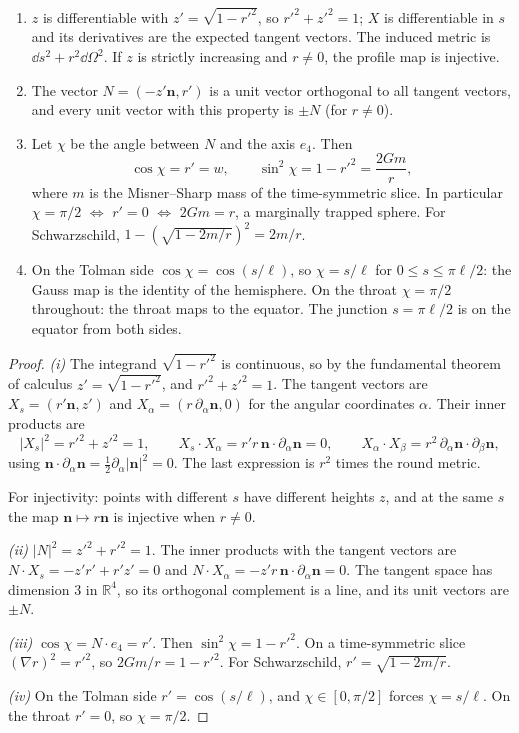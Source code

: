 \begin{theorem}\label{thm:gaussmap}\ver\
\begin{enumerate}[label=(\roman*)]
\item $z$ is differentiable with $z'=\sqrt{1-r'^2}$, so $r'^2+z'^2=1$; $X$ is differentiable in $s$ and its derivatives are the expected tangent vectors. The induced metric is $\dd s^2+r^2\dd\Omega^2$. If $z$ is strictly increasing and $r\ne0$, the profile map is injective.
\item The vector $N=(-z'\mathbf n,r')$ is a unit vector orthogonal to all tangent vectors, and every unit vector with this property is $\pm N$ (for $r\ne0$).
\item Let $\chi$ be the angle between $N$ and the axis $e_4$. Then
\[
\cos\chi=r'=w,\qquad \sin^2\chi=1-r'^2=\frac{2Gm}r,
\]
where $m$ is the Misner--Sharp mass of the time-symmetric slice. In particular $\chi=\pi/2$ $\Leftrightarrow$ $r'=0$ $\Leftrightarrow$ $2Gm=r$, a marginally trapped sphere. For Schwarzschild, $1-(\sqrt{1-2m/r})^2=2m/r$.
\item On the Tolman side $\cos\chi=\cos(s/\ell)$, so $\chi=s/\ell$ for $0\le s\le\pi\ell/2$: the Gauss map is the identity of the hemisphere. On the throat $\chi=\pi/2$ throughout: the throat maps to the equator. The junction $s=\pi\ell/2$ is on the equator from both sides.
\end{enumerate}
\end{theorem}
\begin{proof}
\emph{(i)} The integrand $\sqrt{1-r'^2}$ is continuous, so by the fundamental theorem of calculus $z'=\sqrt{1-r'^2}$, and $r'^2+z'^2=1$. The tangent vectors are $X_s=(r'\mathbf n,z')$ and $X_\alpha=(r\,\partial_\alpha\mathbf n,0)$ for the angular coordinates $\alpha$. Their inner products are
\[
|X_s|^2=r'^2+z'^2=1,\qquad X_s\cdot X_\alpha=r'r\,\mathbf n\cdot\partial_\alpha\mathbf n=0,\qquad X_\alpha\cdot X_\beta=r^2\,\partial_\alpha\mathbf n\cdot\partial_\beta\mathbf n ,
\]
using $\mathbf n\cdot\partial_\alpha\mathbf n=\frac12\partial_\alpha|\mathbf n|^2=0$. The last expression is $r^2$ times the round metric.

For injectivity: points with different $s$ have different heights $z$, and at the same $s$ the map $\mathbf n\mapsto r\mathbf n$ is injective when $r\ne0$.

\emph{(ii)} $|N|^2=z'^2+r'^2=1$. The inner products with the tangent vectors are $N\cdot X_s=-z'r'+r'z'=0$ and $N\cdot X_\alpha=-z'r\,\mathbf n\cdot\partial_\alpha\mathbf n=0$. The tangent space has dimension $3$ in $\mathbb R^4$, so its orthogonal complement is a line, and its unit vectors are $\pm N$.

\emph{(iii)} $\cos\chi=N\cdot e_4=r'$. Then $\sin^2\chi=1-r'^2$. On a time-symmetric slice $(\nabla r)^2=r'^2$, so $2Gm/r=1-r'^2$. For Schwarzschild, $r'=\sqrt{1-2m/r}$.

\emph{(iv)} On the Tolman side $r'=\cos(s/\ell)$, and $\chi\in[0,\pi/2]$ forces $\chi=s/\ell$. On the throat $r'=0$, so $\chi=\pi/2$.
\end{proof}


